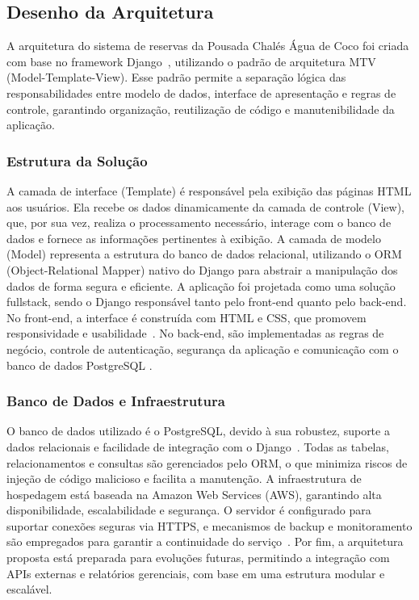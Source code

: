 \documentclass[
	12pt,				%
	openany,			%
	twoside,			%
	a4paper,			%
	english,			%
	french,				%
	spanish,			%
	brazil				%
	]{abntex2}
\begin{document}
\subsection{Desenho da Arquitetura}
A arquitetura do sistema de reservas da Pousada Chalés Água de Coco foi criada com base no framework Django~\cite{django}, utilizando o padrão de arquitetura MTV (Model-Template-View). Esse padrão permite a separação lógica das responsabilidades entre modelo de dados, interface de apresentação e regras de controle, garantindo organização, reutilização de código e manutenibilidade da aplicação.

\subsubsection{Estrutura da Solução}

A camada de interface (Template) é responsável pela exibição das páginas HTML aos usuários. Ela recebe os dados dinamicamente da camada de controle (View), que, por sua vez, realiza o processamento necessário, interage com o banco de dados e fornece as informações pertinentes à exibição. A camada de modelo (Model) representa a estrutura do banco de dados relacional, utilizando o ORM (Object-Relational Mapper) nativo do Django para abstrair a manipulação dos dados de forma segura e eficiente.
A aplicação foi projetada como uma solução fullstack, sendo o Django responsável tanto pelo front-end quanto pelo back-end. No front-end, a interface é construída com HTML e CSS, que promovem responsividade e usabilidade~\cite{duckett}. No back-end, são implementadas as regras de negócio, controle de autenticação, segurança da aplicação e comunicação com o banco de dados PostgreSQL
.
\subsubsection{Banco de Dados e Infraestrutura}

O banco de dados utilizado é o PostgreSQL, devido à sua robustez, suporte a dados relacionais e facilidade de integração com o Django~\cite{postgresql}. Todas as tabelas, relacionamentos e consultas são gerenciados pelo ORM, o que minimiza riscos de injeção de código malicioso e facilita a manutenção.
A infraestrutura de hospedagem está baseada na Amazon Web Services (AWS), garantindo alta disponibilidade, escalabilidade e segurança. O servidor é configurado para suportar conexões seguras via HTTPS, e mecanismos de backup e monitoramento são empregados para garantir a continuidade do serviço~\cite{aws-doc}.
Por fim, a arquitetura proposta está preparada para evoluções futuras, permitindo a integração com APIs externas e relatórios gerenciais, com base em uma estrutura modular e escalável.
\end{document}
